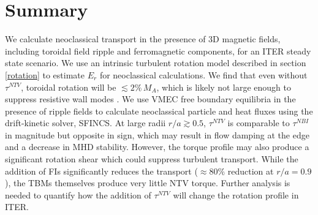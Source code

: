 \documentclass{article}
\numberwithin{figure}{section}
\numberwithin{equation}{section}
\begin{document}
\FloatBarrier

\section{Summary}\label{summary}

We calculate neoclassical transport in the presence of 3D magnetic fields, including toroidal field ripple and ferromagnetic components, for an ITER steady state scenario. We use an intrinsic turbulent rotation model described in section \ref{rotation} to estimate $E_r$ for neoclassical calculations. We find that even without $\tau^{NTV}$, toroidal rotation will be $\lesssim 2\% \,M_A$, which is likely not large enough to suppress resistive wall modes \cite{Liu2004}. We use VMEC free boundary equilibria in the presence of ripple fields to calculate neoclassical particle and heat fluxes using the drift-kinetic solver, SFINCS. At large radii $r/a \gtrsim 0.5$, $\tau^{NTV}$ is comparable to $\tau^{NBI}$ in magnitude but opposite in sign, which may result in flow damping at the edge and a decrease in MHD stability. However, the torque profile may also produce a significant rotation shear which could suppress turbulent transport. While the addition of FIs significantly reduces the transport ($\approx 80\%$ reduction at $r/a = 0.9$), the TBMs themselves produce very little NTV torque. Further analysis is needed to quantify how the addition of $\tau^{NTV}$ will change the rotation profile in ITER. 

\appendix
\end{document}
